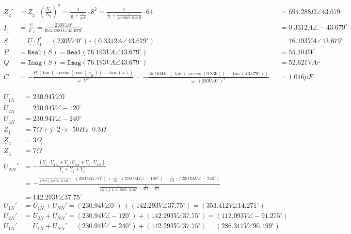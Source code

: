\begin{align*}
\underline{Z}_2' &=\underline{Z}_2\cdot \left(\frac{N_1}{N_2}\right)^2  =\frac{1}{\frac{1}{R} +\frac{1}{j\omega L}}\cdot 8^2 =  \frac{1}{\frac{1}{15} +\frac{1}{j 2\pi 50Hz\cdot 0.05H}}\cdot 64 &&= 694.288\Omega\angle 43.679^\circ\\
\underline{I}_1 &= \frac{\underline{U}}{\underline{Z}'_2} = \frac{230V\angle 0^\circ}{694.288\Omega\angle 43.679^\circ} &&=  0.3312A\angle-43.679^\circ\\
\underline{S} &= \underline{U}\cdot \underline{I}_1^*=(230V\angle 0^\circ) \cdot (0.3312A\angle 43.679^\circ)&&= 76.193VA\angle 43.679^\circ\\
P &= \texttt{Real}(S) = \texttt{Real}(76.193VA\angle 43.679^\circ)&&=55.104W\\
Q &= \texttt{Imag}(S) = \texttt{Imag}(76.193VA\angle 43.679^\circ)&&=52.621VAr\\
C &= -\frac{P\cdot (\tan(\arccos(\cos(\varphi_K))-\tan(\varphi))}{\omega \cdot \underline{U}^2} = -\frac{55.104W\cdot (\tan(\arccos(0.839))-\tan(43.679^\circ))}{\omega\cdot (230V\angle 0^\circ)^2}&&=1.016\mu F
\end{align*}

\newpage

\begin{align*}
\underline{U}_{1N} &= 230.94V \angle 0^\circ\\
\underline{U}_{2N} &= 230.94V \angle -120^\circ\\
\underline{U}_{3N} &= 230.94V \angle -240^\circ\\
\underline{Z}_1&= 7\Omega + j\cdot 2\cdot \pi \cdot 50 Hz\cdot 0.3H\\
\underline{Z}_2&= 3\Omega\\
\underline{Z}_3&= 7\Omega\\
\underline{U}_{NN}'&= -\frac{\left( \underline{Y}_1\cdot \underline{U}_{1N} +\underline{Y}_2\cdot \underline{U}_{2N} +\underline{Y}_3 \cdot \underline{U}_{3N} \right)}{\underline{Y}_1+\underline{Y}_2+\underline{Y}_3}\\
 &= -\frac{\frac{1}{(7\Omega + j 2 \pi 50 \cdot 0.3H)}\cdot (230.94V \angle 0^\circ) +\frac{1}{3\Omega}\cdot (230.94V \angle -120^\circ)+\frac{1}{7\Omega} \cdot (230.94V \angle -240^\circ) }{\frac{1}{7\Omega + j\cdot 2\cdot \pi \cdot 50 Hz\cdot 0.3H}+\frac{1}{3\Omega}+ \frac{1}{7\Omega}}\\
&= 142.293V\angle 37.75^\circ\\
U_{1N}' &=U_{1N} + U_{NN}' = (230.94V\angle0^\circ) + (142.293V\angle 37.75^\circ) = (353.412V\angle 14.271^\circ)\\
U_{2N}' &=U_{2N} + U_{NN}' = (230.94V\angle -120^\circ) + (142.293V\angle 37.75^\circ) = (112.093V\angle -91.275^\circ)\\
U_{1N}' &=U_{1N} + U_{NN}' = (230.94V\angle -240^\circ) + (142.293V\angle 37.75^\circ) = (286.317V\angle 90.499^\circ)\\
\end{align*}


